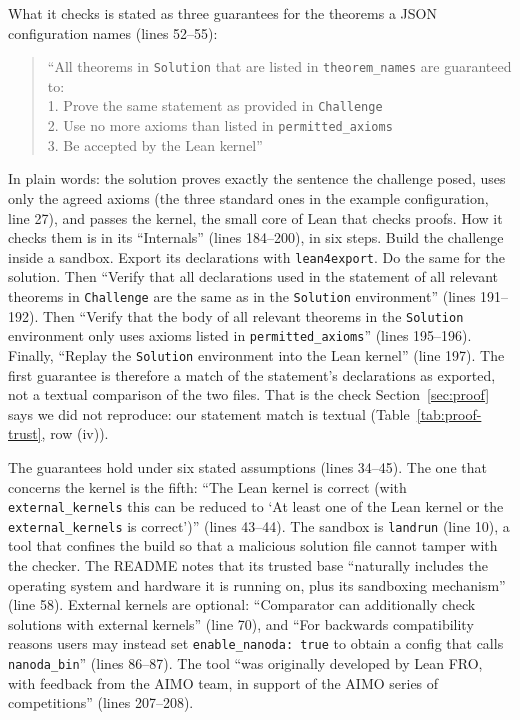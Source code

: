What it checks is stated as three guarantees for the theorems a JSON
configuration names (lines 52--55):
\begin{quote}\small
``All theorems in \texttt{Solution} that are listed in
\texttt{theorem\_names} are guaranteed to:\\
1. Prove the same statement as provided in \texttt{Challenge}\\
2. Use no more axioms than listed in \texttt{permitted\_axioms}\\
3. Be accepted by the Lean kernel''
\end{quote}
In plain words: the solution proves exactly the sentence
the challenge posed, uses only the agreed axioms (the three standard ones
in the example configuration, line 27), and passes the kernel, the small
core of Lean that checks proofs. How it checks them is in its
``Internals'' (lines 184--200), in six steps. Build the challenge inside a
sandbox. Export its declarations with \texttt{lean4export}. Do the same
for the solution. Then ``Verify that all declarations used in the statement of
all relevant theorems in \texttt{Challenge} are the same as in the
\texttt{Solution} environment'' (lines 191--192). Then ``Verify that the body
of all relevant theorems in the \texttt{Solution} environment only uses
axioms listed in \texttt{permitted\_axioms}'' (lines 195--196). Finally,
``Replay the \texttt{Solution} environment into the Lean kernel'' (line
197). The first guarantee is therefore a match of the statement's
declarations as exported, not a textual comparison of the two files.
That is the check Section~\ref{sec:proof} says we did not reproduce: our
statement match is textual (Table~\ref{tab:proof-trust}, row (iv)).

The guarantees hold under six stated assumptions (lines 34--45). The one
that concerns the kernel is the fifth: ``The Lean kernel is correct (with
\texttt{external\_kernels} this can be reduced to `At least one of the
Lean kernel or the \texttt{external\_kernels} is correct')'' (lines
43--44). The sandbox is \texttt{landrun} (line 10), a tool that confines
the build so that a malicious solution file cannot tamper with the
checker. The README notes that its trusted base ``naturally includes the
operating system and hardware it is running on, plus its sandboxing
mechanism'' (line 58). External kernels are optional: ``Comparator can
additionally check solutions with external kernels'' (line 70), and ``For
backwards compatibility reasons users may instead set
\texttt{enable\_nanoda: true} to obtain a config that calls
\texttt{nanoda\_bin}'' (lines 86--87). The tool ``was originally
developed by Lean FRO, with feedback from the AIMO team, in support of
the AIMO series of competitions'' (lines 207--208).

